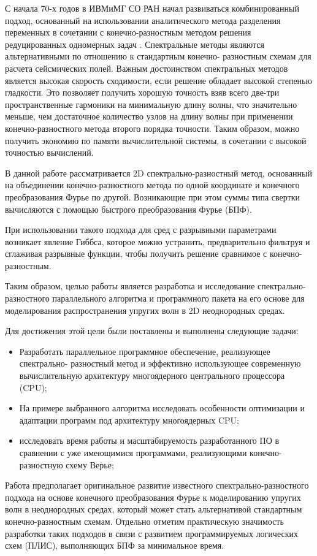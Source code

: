 С начала 70-х годов в ИВМиМГ СО РАН начал развиваться комбинированный подход, основанный на использовании аналитического метода разделения переменных в сочетании с конечно-разностным методом решения редуцированных одномерных задач \cite{alex}. Спектральные методы являются альтернативными по отношению к стандартным конечно-
разностным схемам для расчета сейсмических полей. Важным достоинством
спектральных методов является высокая скорость сходимости, если решение обладает
высокой степенью гладкости. Это позволяет получить хорошую точность взяв всего две-три
пространственные гармоники на минимальную длину волны, что значительно меньше, 
чем достаточное количество узлов на длину волны при применении конечно-разностного метода второго порядка точности.
Таким образом, можно получить экономию по памяти вычислительной системы, в сочетании с высокой точностью вычислений.

В данной работе рассматривается 2D спектрально-разностный метод, основанный на
объединении конечно-разностного метода по одной координате и конечного
преобразования Фурье по другой. Возникающие при этом суммы
типа свертки вычисляются с помощью быстрого преобразования Фурье (БПФ).

При использовании такого подхода для сред с разрывными параметрами возникает явление Гиббса,
которое можно устранить, предварительно фильтруя и сглаживая разрывные функции,
чтобы получить решение сравнимое с конечно-разностным.

Таким образом, целью работы является разработка  и исследование спектрально-разностного
параллельного алгоритма и программного пакета на его основе для моделирования распространения
упругих волн в 2D неоднородных средах.

Для достижения этой цели были поставлены и выполнены следующие задачи:
\begin{itemize}
    \item Разработать параллельное программное обеспечение, реализующее спектрально-
разностный метод и эффективно использующее современную вычислительную
архитектуру многоядерного центрального процессора (CPU);
    \item На примере выбранного алгоритма исследовать особенности оптимизации и адаптации программ под архитектуру многоядерных CPU;
    \item исследовать время работы и масштабируемость разработанного ПО в
сравнении с уже имеющимися программами, реализующими конечно-разностную схему
Верье;
\end{itemize}

Работа предполагает оригинальное развитие известного спектрально-разностного подхода
на основе конечного преобразования Фурье к моделированию упругих волн в
неоднородных средах, который может стать альтернативой стандартным конечно-разностным схемам.
Отдельно отметим практическую значимость разработки таких подходов в связи с развитием
программируемых логических схем (ПЛИС), выполняющих БПФ за минимальное время.

\clearpage
